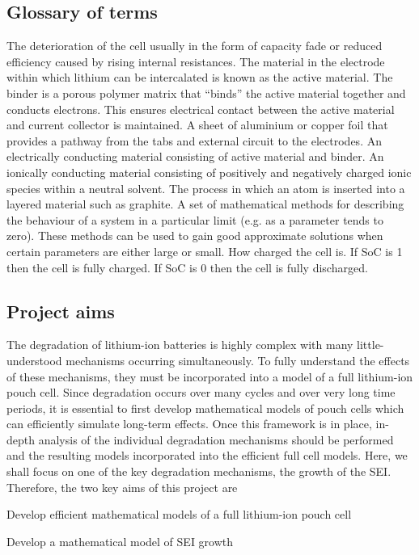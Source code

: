 \documentclass[english,a4paper,oneside,9pt]{extarticle}
\begin{document}
\subsection{Glossary of terms}

\begin{infommitemize}
	 The deterioration of the cell usually in the form of capacity fade or reduced efficiency caused by rising internal resistances.
	 The material in the electrode within which lithium can be intercalated is known as the active material.
	 The binder is a porous polymer matrix that ``binds'' the active material together and conducts electrons. This ensures electrical contact between the active material and current collector is maintained.
	 A sheet of aluminium or copper foil that provides a pathway from the tabs and external circuit to the electrodes.
	 An electrically conducting material consisting of active material and binder.
	 An ionically conducting material consisting of positively and negatively charged ionic species within a neutral solvent.
	 The process in which an atom is inserted into a layered material such as graphite.
	 A set of mathematical methods for describing the behaviour of a system in a particular limit (e.g. as a parameter tends to zero). These methods can be used to gain good approximate solutions when certain parameters are either large or small.
	 How charged the cell is. If SoC is 1 then the cell is fully charged. If SoC is 0 then the cell is fully discharged.
\end{infommitemize}

\newpage
\subsection{Project aims}
The degradation of lithium-ion batteries is highly complex with many little-understood mechanisms occurring simultaneously. To fully understand the effects of these mechanisms, they must be incorporated into a model of a full lithium-ion pouch cell. Since degradation occurs over many cycles and over very long time periods, it is essential to first develop mathematical models of pouch cells which can efficiently simulate long-term effects. Once this framework is in place, in-depth analysis of the individual degradation mechanisms should be performed and the resulting models incorporated into the efficient full cell models. Here, we shall focus on one of the key degradation mechanisms, the growth of the SEI. Therefore, the two key aims of this project are
\begin{infommitemize}
	\item Develop efficient mathematical models of a full lithium-ion pouch cell
	\item Develop a mathematical model of SEI growth
\end{infommitemize}
\end{document}
